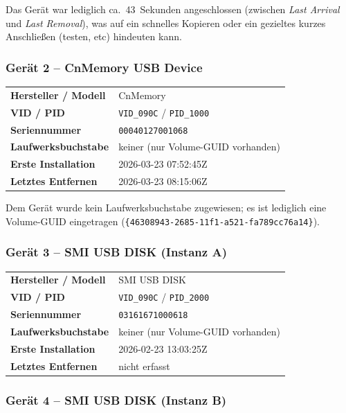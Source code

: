 \medskip
\noindent
Das Gerät war lediglich ca.\ 43~Sekunden angeschlossen (zwischen \emph{Last Arrival} und \emph{Last Removal}), was auf ein schnelles Kopieren oder ein gezieltes kurzes Anschließen (testen, etc) hindeuten kann.

\subsubsection*{Gerät 2 – CnMemory USB Device}

\begin{tabular}{ll}
	\textbf{Hersteller / Modell}   & CnMemory \\
	\textbf{VID / PID}             & \texttt{VID\_090C} / \texttt{PID\_1000} \\
	\textbf{Seriennummer}          & \texttt{00040127001068} \\
	\textbf{Laufwerksbuchstabe}    & keiner (nur Volume-GUID vorhanden) \\
	\textbf{Erste Installation}    & 2026-03-23 07:52:45Z \\
	\textbf{Letztes Entfernen}     & 2026-03-23 08:15:06Z \\
\end{tabular}

\medskip
\noindent
Dem Gerät wurde kein Laufwerksbuchstabe zugewiesen; es ist lediglich eine
Volume-GUID eingetragen (\texttt{\{46308943-2685-11f1-a521-fa789cc76a14\}}).

\subsubsection*{Gerät 3 – SMI USB DISK (Instanz A)}

\begin{tabular}{ll}
	\textbf{Hersteller / Modell}   & SMI USB DISK \\
	\textbf{VID / PID}             & \texttt{VID\_090C} / \texttt{PID\_2000} \\
	\textbf{Seriennummer}          & \texttt{03161671000618} \\
	\textbf{Laufwerksbuchstabe}    & keiner (nur Volume-GUID vorhanden) \\
	\textbf{Erste Installation}    & 2026-02-23 13:03:25Z \\
	\textbf{Letztes Entfernen}     & nicht erfasst \\
\end{tabular}

\subsubsection*{Gerät 4 – SMI USB DISK (Instanz B)}

